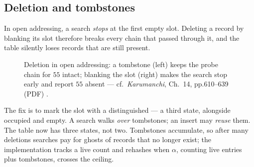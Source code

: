 \documentclass[11pt]{article}
\begin{document}
\subsection{Deletion and tombstones}

In open addressing, a search \emph{stops} at the first empty slot. Deleting a record by blanking its slot therefore breaks every chain that passed through it, and the table silently loses records that are still present.

\begin{figure}[h]
  \centering
  \caption{Deletion in open addressing: a tombstone (left) keeps the probe chain for $55$ intact; blanking the slot (right) makes the search stop early and report $55$ absent --- cf.\ \textit{Karumanchi}, Ch.~14, pp.610--639 (PDF) \cite{Karumanchi2017_data_structures_algorithms_made_easy}.}
\end{figure}

The fix is to mark the slot with a distinguished  --- a third state, alongside occupied and empty. A search walks \emph{over} tombstones; an insert may \emph{reuse} them. The table now has three states, not two. Tombstones accumulate, so after many deletions searches pay for ghosts of records that no longer exist; the implementation tracks a live count and rehashes when $\alpha$, counting live entries plus tombstones, crosses the ceiling.
\end{document}
